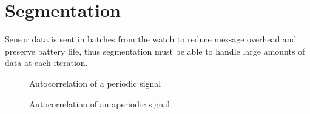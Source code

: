 \section{Segmentation}

Sensor data is sent in batches from the watch to reduce message overhead and preserve battery life, thus segmentation must be able to handle large amounts of data at each iteration.

\begin{figure}
    \centering
    \caption{Autocorrelation of a periodic signal}
\end{figure}

\begin{figure}
    \centering
    \caption{Autocorrelation of an aperiodic signal}
\end{figure}

